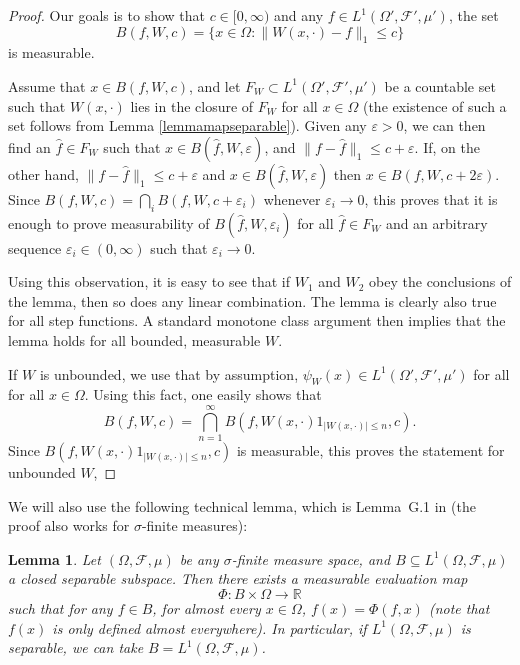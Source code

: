 \documentclass{amsart}
\numberwithin{equation}{section}
\numberwithin{figure}{section}
\newtheorem{lemma}[theorem]{Lemma}
\theoremstyle{definition}
\theoremstyle{remark}
\newcommand{\eps}{\varepsilon}
\newcommand{\cF}{\mathcal{F}}
\begin{document}
\begin{proof}
Our goals is to show that $c\in [0,\infty)$ and any $f \in
L^1(\Omega',\cF'{,\mu'})$, the set
\[
B(f,W,c)=\{x \in \Omega:
\|W(x,\cdot)-f\|_1 \le c\}
\]
is measurable.

Assume that $x\in B(f,W,c)$, and let $F_W\subset L^1(\Omega',\cF',\mu')$ be a
countable set such that $W(x,\cdot)$ lies in the closure of $F_W$ for all
$x\in \Omega$ (the existence of such a set follows from Lemma
\ref{lemmamapseparable}). Given any $\varepsilon>0$, we can then find an
$\widehat f\in F_W$ such that $x\in B(\widehat f,W,\eps)$, and $\|f-\widehat
f\|_1\leq c+\eps$. If, on the other hand, $\|f-\widehat f\|_1\leq c+\eps$ and
$x\in B(\widehat f,W,\eps)$ then $x\in B( f,W,c+2\eps)$. Since $ B(
f,W,c)=\bigcap_i B( f,W,c+\eps_i)$ whenever $\eps_i\to 0$, this proves that
it is enough to prove measurability of $B(\widehat f,W,\eps_{i})$ for all
$\widehat f\in F_W$ and an arbitrary sequence $\eps_i\in (0,\infty)$ such
that $\eps_i\to 0$.

Using this observation, it is easy to see that if $W_1$ and $W_2$ obey the
conclusions of the lemma, then so does any linear combination. The lemma is
clearly also true for all step functions. A standard monotone class argument
then implies that the lemma holds for all bounded, measurable $W$.

If $W$ is unbounded, we use that by assumption, $\psi_W(x)\in
L^1(\Omega',\cF',\mu')$ for all for all $x\in\Omega$. Using this fact, one
easily shows that
\[
B(f,W,c)=\bigcap_{n{=}1}^\infty B(f,W(x,\cdot)1_{|W(x,\cdot)|\leq n},c).
\]
Since $B(f,W(x,\cdot)1_{|W(x,\cdot)|\leq n},c)$ is measurable, this proves
the statement for unbounded $W$,
\end{proof}

We will also use the following technical lemma, which is Lemma~G.1 in
\cite{JANSON13} (the proof also works for $\sigma$-finite measures):

\begin{lemma} \label{lemmaevaluationmap}
Let $(\Omega,\cF,\mu)$ be any $\sigma$-finite measure space, and $B
\subseteq L^1(\Omega,\cF{,\mu})$ a closed separable subspace. Then
there exists a measurable evaluation map
\[
\Phi\colon B \times \Omega \rightarrow \mathbb{R}
\]
such that for any $f \in B$, for almost every $x \in \Omega$,
$f(x)=\Phi(f,x)$ (note that $f(x)$ is only defined almost everywhere). In
particular, if $L^1(\Omega,\cF{,\mu})$ is separable, we can take
$B=L^1(\Omega,\cF,\mu)$.
\end{lemma}
\end{document}
